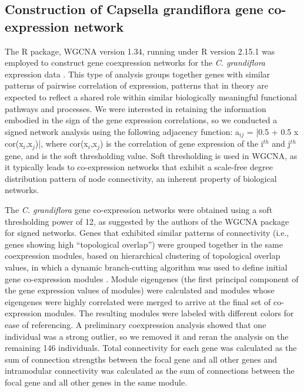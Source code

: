 \subsection{Construction of Capsella grandiflora gene co-expression network}
The R package, WGCNA version 1.34, running under R version 2.15.1 \citep{r} was employed to construct gene coexpression networks for the \textit{C. grandiflora} expression data \citep{langfelder2008}. This type of analysis groups together genes with similar patterns of pairwise correlation of expression, patterns that in theory are expected to reflect a shared role within similar biologically meaningful functional pathways and processes. We were interested in retaining the information embodied in the sign of the gene expression correlations, so we conducted a signed network analysis using the following adjacency function: a$_{ij}$ = |0.5 + 0.5 x cor(x$_{i}$,x$_{j}$)|, where cor(x$_{i}$,x$_{j}$) is the correlation of gene expression of the i$^{th}$ and j$^{th}$ gene, and is the soft thresholding value. Soft thresholding is used in WGCNA, as it typically leads to co-expression networks that exhibit a scale-free degree distribution pattern of node connectivity, an inherent property of biological networks. 

The \textit{C. grandiflora} gene co-expression networks were obtained using  a soft thresholding power of 12, as suggested by the authors of the WGCNA package for signed networks. Genes that exhibited similar patterns of connectivity (i.e., genes showing high “topological overlap”) were grouped together in the same coexpression modules, based on hierarchical clustering of topological overlap values, in which a dynamic branch-cutting algorithm was used to define initial gene co-expression modules \citep{langfelder2008}.  Module eigengenes (the first principal component of the gene expression values of modules) were calculated and modules whose eigengenes were highly correlated were merged to arrive at the final set of co-expression modules. The resulting modules were labeled with different colors for ease of referencing. A preliminary coexpression analysis showed that one individual was a strong outlier, so we removed it and reran the analysis on the remaining 146 individuals. Total connectivity for each gene was calculated as the sum of connection strengths between the focal gene and all other genes and intramodular connectivity was calculated as the sum of connections between the focal gene and all other genes in the same module. 

